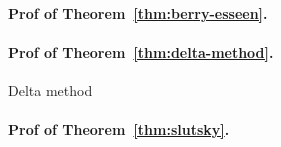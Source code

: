 \documentclass[
	fontsize=11pt, %
	twoside=false, %
	numbers=noenddot, %
]{kaobook}
\begin{document}
\paragraph{Prof of Theorem~\ref{thm:berry-esseen}.}


\paragraph{Prof of Theorem~\ref{thm:delta-method}.} 

Delta method

\paragraph{Prof of Theorem~\ref{thm:slutsky}.}
\end{document}
